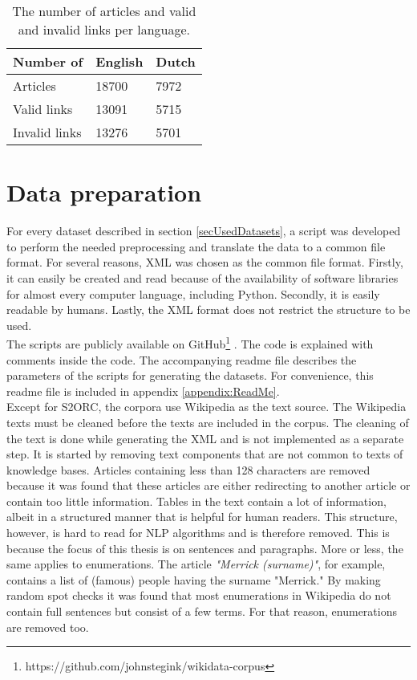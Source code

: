 \begin{table}[h!tbp]
    \centering
    \begin{tabular}{l|l|l}

\textbf{Number of} & \textbf{English} & \textbf{Dutch}  \\
		\hline
Articles      & 18700   & 7972   \\
		\hline
Valid links   & 13091   & 5715   \\
		\hline
Invalid links & 13276   & 5701 \\
		\hline
    \end{tabular}
    \caption{The number of articles and valid and invalid links per language.}
  	\label{tabGWikiMatch}
\end{table}



\section{Data preparation}
\label{secDataPreparation}

For every dataset described in section \ref{secUsedDatasets}, a script was developed to perform the needed preprocessing and translate the data to a common file format. For several reasons, XML was chosen as the common file format. Firstly, it can easily be created and read because of the availability of software libraries for almost every computer language, including Python. Secondly, it is easily readable by humans. Lastly, the XML format does not restrict the structure to be used.\\
The scripts are publicly available on GitHub\footnote{https://github.com/johnstegink/wikidata-corpus} %
. The code is explained with comments inside the code. The accompanying readme file describes the parameters of the scripts for generating the datasets. For convenience, this readme file is included in appendix \ref{appendix:ReadMe}.\\

Except for S2ORC, the corpora use Wikipedia as the text source. The Wikipedia texts must be cleaned before the texts are included in the corpus. The cleaning of the text is done while generating the XML and is not implemented as a separate step. It is started by removing text components that are not common to texts of knowledge bases. Articles containing less than 128 characters are removed because it was found that these articles are either redirecting to another article or contain too little information. Tables in the text contain a lot of information, albeit in a structured manner that is helpful for human readers. This structure, however, is hard to read for NLP algorithms and is therefore removed. This is because the focus of this thesis is on sentences and paragraphs. More or less, the same applies to enumerations. The article \textit{"Merrick (surname)"}, for example, contains a list of (famous) people having the surname "Merrick." By making random spot checks it was found that most enumerations in Wikipedia do not contain full sentences but consist of a few terms. For that reason, enumerations are removed too.\\

